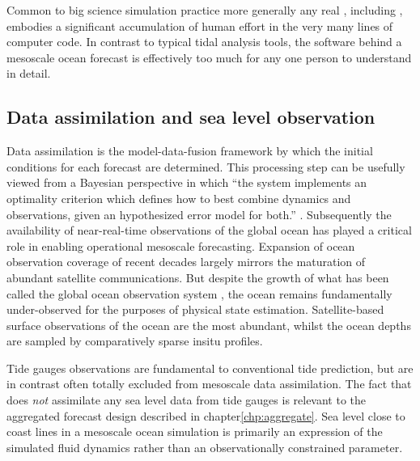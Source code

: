 Common to big science simulation practice more generally \citep{Petersen:2012tr} any real \OGCM{}, including \BL{}, embodies a significant accumulation of human effort in the very many lines of computer code.  In contrast to typical tidal analysis tools, the software behind a mesoscale ocean forecast is effectively too much for any one person to understand in detail.
\subsection{Data assimilation and sea level observation}
Data assimilation is the model-data-fusion framework by which the initial conditions for each \OGCM{} forecast are determined.
This processing step can be usefully viewed from a Bayesian perspective in which ``the system implements an optimality criterion which defines how to best combine dynamics and observations, given an hypothesized error model for both.'' \citep{10.1007/978-94-007-0332-2_13}.
Subsequently the availability of near-real-time observations of the global ocean has played a critical role in enabling operational mesoscale forecasting.  Expansion of ocean observation coverage of recent decades largely mirrors the maturation of abundant satellite communications.  But despite the growth of what has been called the global ocean observation system \GOOS{} \citep{Komen:1999ch}, the ocean remains fundamentally under-observed for the purposes of physical state estimation.   Satellite-based surface observations of the ocean are the most abundant, whilst the ocean depths are sampled by comparatively sparse insitu profiles.


Tide gauges observations are fundamental to conventional tide prediction, but are in contrast often totally excluded from mesoscale data assimilation.   The fact that \BL{} does \emph{not} assimilate any sea level data from tide gauges is relevant to the aggregated forecast design described in chapter\ref{chp:aggregate}.      
Sea level close to coast lines in a mesoscale ocean simulation is primarily an expression of the simulated fluid dynamics rather than an observationally constrained parameter.

